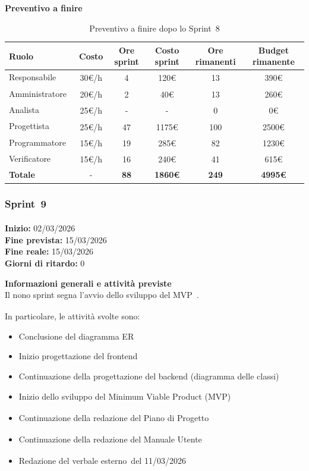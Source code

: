 \documentclass[a4paper,12pt]{article}
\newcommand{\pediceG}{\texorpdfstring{\textsubscript{\scalebox{0.6}{\textbf{G}}}~}{G}}
\begin{document}
\noindent\textbf{Preventivo a finire}

\begin{table}[H]
\centering
\footnotesize
\begin{tabular}{|l|c|c|c|c|c|}
\hline
Ruolo & Costo & Ore sprint & Costo sprint & Ore rimanenti & Budget rimanente \\
\hline
Responsabile\pediceG & 30€/h & 4 & 120€ & 13 & 390€ \\
\hline
Amministratore\pediceG & 20€/h & 2 & 40€ & 13 & 260€ \\
\hline
Analista\pediceG & 25€/h & - & - & 0 & 0€ \\
\hline
Progettista\pediceG & 25€/h & 47 & 1175€ & 100 & 2500€ \\
\hline
Programmatore\pediceG & 15€/h & 19 & 285€ & 82 & 1230€ \\
\hline
Verificatore\pediceG & 15€/h & 16 & 240€ & 41 & 615€ \\
\hline
\textbf{Totale} & - & \textbf{88} & \textbf{1860€} & \textbf{249} & \textbf{4995€} \\
\hline
\end{tabular}
\caption{Preventivo a finire dopo lo Sprint\pediceG 8}
\label{tab:risorse-sprint8}
\end{table}

\newpage
\subsubsection{Sprint\pediceG 9}
 
\textbf{Inizio:} 02/03/2026 \\
\textbf{Fine prevista:} 15/03/2026 \\
\textbf{Fine reale:} 15/03/2026 \\
\textbf{Giorni di ritardo:} 0
 
\noindent\textbf{Informazioni generali e attività previste}\\
Il nono sprint segna l'avvio dello sviluppo del MVP\pediceG.
 
In particolare, le attività svolte sono:
\begin{itemize}
\item Conclusione del diagramma ER
\item Inizio progettazione del frontend
\item Continuazione della progettazione del backend (diagramma delle classi)
\item Inizio dello sviluppo del Minimum Viable Product (MVP)\pediceG
\item Continuazione della redazione del Piano di Progetto\pediceG
\item Continuazione della redazione del Manuale Utente\pediceG
\item Redazione del verbale esterno\pediceG del 11/03/2026
\end{itemize}
 
\end{document}
